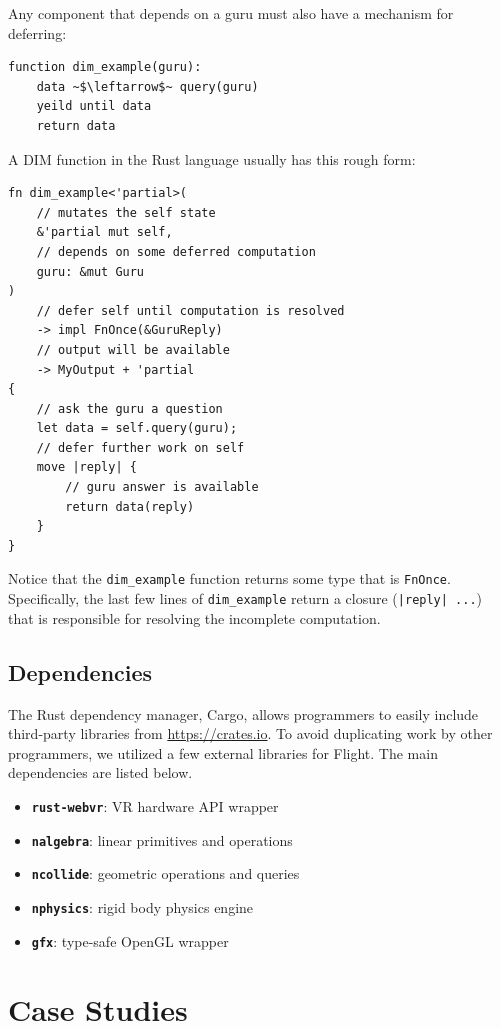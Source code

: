 \documentclass[conference,12pt]{IEEEtran}
\begin{document}
Any component that depends on a guru must also have a mechanism for deferring:

\begin{verbatim}
function dim_example(guru):
    data ~$\leftarrow$~ query(guru)
    yeild until data
    return data
\end{verbatim}

A DIM function in the Rust language usually has this rough form:

\begin{verbatim}
fn dim_example<'partial>(
    // mutates the self state
    &'partial mut self,
    // depends on some deferred computation
    guru: &mut Guru
)
    // defer self until computation is resolved
    -> impl FnOnce(&GuruReply)
    // output will be available
    -> MyOutput + 'partial
{
    // ask the guru a question
    let data = self.query(guru);
    // defer further work on self
    move |reply| {
        // guru answer is available
        return data(reply)
    }
}
\end{verbatim}

Notice that the \texttt{dim\_example} function returns some type that is
\texttt{FnOnce}. Specifically, the last few lines of \texttt{dim\_example}
return a closure (\texttt{|reply| ...}) that is responsible for
resolving the incomplete computation.

\subsection{Dependencies}

The Rust dependency manager, Cargo, allows programmers to easily include
third-party libraries from \url{https://crates.io}. To avoid duplicating work
by other programmers, we utilized a few external libraries for Flight. The main
dependencies are listed below.
\begin{itemize}
    \item \textbf{\texttt{rust-webvr}}: VR hardware API wrapper
    \item \textbf{\texttt{nalgebra}}: linear primitives and operations
    \item \textbf{\texttt{ncollide}}: geometric operations and queries
    \item \textbf{\texttt{nphysics}}: rigid body physics engine
    \item \textbf{\texttt{gfx}}: type-safe OpenGL wrapper
\end{itemize}

\section{Case Studies}\label{sec:case-studies}
\end{document}
